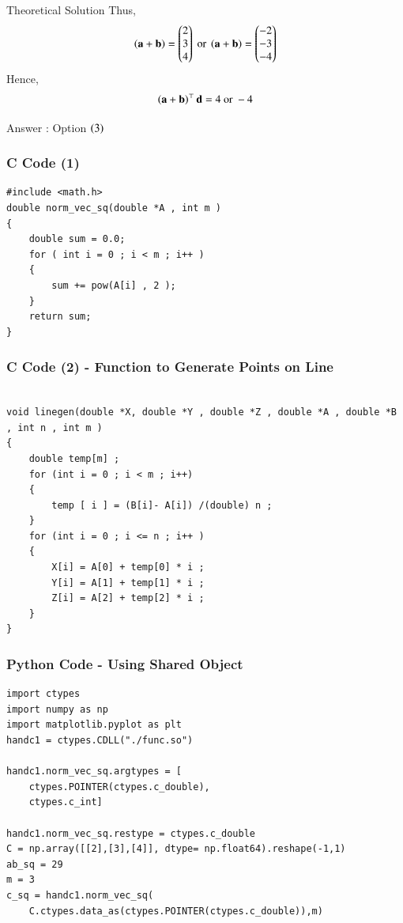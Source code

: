 \documentclass{beamer}
\begin{document}
\begin{frame}{Theoretical Solution}
Thus, 
\begin{align}
    \left(\mathbf{a} + \mathbf{b}\right) = \begin{pmatrix}2 \\ 3 \\ 4\end{pmatrix} \text{ or } \left(\mathbf{a} + \mathbf{b}\right) = \begin{pmatrix}-2 \\ -3 \\ -4\end{pmatrix}
\end{align}
Hence, 
\begin{align}
    \left(\mathbf{a} + \mathbf{b}\right)^{\top}\mathbf{d} = 4 \text{ or } -4
\end{align}

Answer : Option $\left(3\right)$
\end{frame}


\begin{frame}[fragile]
    \frametitle{C Code (1) }

    \begin{lstlisting}
#include <math.h>
double norm_vec_sq(double *A , int m )
{
    double sum = 0.0; 
    for ( int i = 0 ; i < m ; i++ )
    {
        sum += pow(A[i] , 2 );
    }
    return sum; 
}
    \end{lstlisting}
\end{frame}



\begin{frame}[fragile]
    \frametitle{C Code (2) - Function to Generate Points on Line}
    \begin{lstlisting}

void linegen(double *X, double *Y , double *Z , double *A , double *B , int n , int m )
{
    double temp[m] ; 
    for (int i = 0 ; i < m ; i++)
    {
        temp [ i ] = (B[i]- A[i]) /(double) n ; 
    }
    for (int i = 0 ; i <= n ; i++ )
    {
        X[i] = A[0] + temp[0] * i ; 
        Y[i] = A[1] + temp[1] * i ;
        Z[i] = A[2] + temp[2] * i ; 
    }
}

\end{lstlisting}
\end{frame}

\begin{frame}[fragile]
    \frametitle{Python Code - Using Shared Object}
    \begin{lstlisting}
import ctypes
import numpy as np
import matplotlib.pyplot as plt
handc1 = ctypes.CDLL("./func.so")

handc1.norm_vec_sq.argtypes = [
    ctypes.POINTER(ctypes.c_double),
    ctypes.c_int]

handc1.norm_vec_sq.restype = ctypes.c_double
C = np.array([[2],[3],[4]], dtype= np.float64).reshape(-1,1)
ab_sq = 29
m = 3
c_sq = handc1.norm_vec_sq(
    C.ctypes.data_as(ctypes.POINTER(ctypes.c_double)),m)
\end{lstlisting}
\end{frame}
\end{document}
